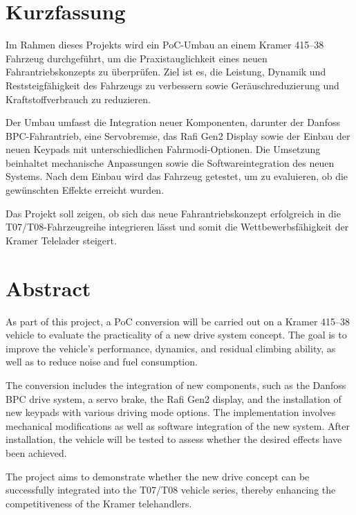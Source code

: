 \documentclass[a4paper, 12pt]{article} %
\begin{document}
\section*{Kurzfassung}
\begin{spacing}{1.8}  %
    \fontsize{14pt}{14pt}\selectfont  %
    Im Rahmen dieses Projekts wird ein \acf{PoC}-Umbau an einem Kramer 415–38 Fahrzeug durchgeführt,
    um die Praxistauglichkeit eines neuen Fahrantriebskonzepts zu überprüfen. Ziel ist es, die Leistung,
    Dynamik und Reststeigfähigkeit des Fahrzeugs zu verbessern sowie Geräuschreduzierung und Kraftstoffverbrauch zu reduzieren.
    
    Der Umbau umfasst die Integration neuer Komponenten, darunter der Danfoss \ac{BPC}-Fahrantrieb,
    eine Servobremse, das Rafi Gen2 Display sowie der Einbau der neuen Keypads
    mit unterschiedlichen Fahrmodi-Optionen. Die Umsetzung beinhaltet mechanische Anpassungen sowie die
    Softwareintegration des neuen Systems. Nach dem Einbau wird das Fahrzeug getestet, um zu evaluieren,
    ob die gewünschten Effekte erreicht wurden.
    
    Das Projekt soll zeigen, ob sich das neue Fahrantriebskonzept erfolgreich in die T07/T08-Fahrzeugreihe
    integrieren lässt und somit die Wettbewerbsfähigkeit der Kramer Telelader steigert.
    
\end{spacing}

\clearpage
\section*{Abstract}
\begin{spacing}{1.8}  %
    \fontsize{14pt}{14pt}\selectfont  %
    As part of this project, a \acf{PoC} conversion will be carried out on a Kramer 415–38 vehicle
to evaluate the practicality of a new drive system concept. The goal is to improve the vehicle’s
performance, dynamics, and residual climbing ability, as well as to reduce noise and fuel consumption.

The conversion includes the integration of new components, such as the Danfoss \ac{BPC} drive system,
a servo brake, the Rafi Gen2 display, and the installation of new keypads
with various driving mode options. The implementation involves mechanical modifications as well as
software integration of the new system. After installation, the vehicle will be tested to assess
whether the desired effects have been achieved.

The project aims to demonstrate whether the new drive concept can be successfully integrated
into the T07/T08 vehicle series, thereby enhancing the competitiveness of the Kramer telehandlers.


\end{spacing}
\clearpage
\end{document}
